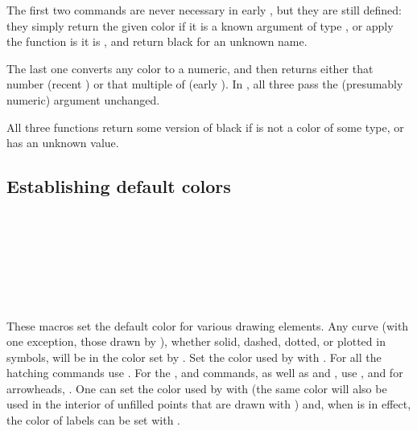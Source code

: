 \documentclass[letterpaper]{article}
\begin{document}
The first two commands are never necessary in early \MP{}, but they are
still defined: they simply return the given color if it is a known
argument of type , or apply the function  is it is
, and return black for an unknown name.

The last one  converts any color to a numeric, and then
returns either that number (recent \MP) or that multiple of 
(early \MP). In \MF{}, all three pass the (presumably numeric) argument
 unchanged.

All three functions return some version of black if  is not a
color of some type, or has an unknown value.


\subsection{Establishing \mfp{} default colors}\label{defaultcolors}

\begin{cd}
\\
\\
\\
\\
\\
\\
%
%
%
%
%
%
%
%
\end{cd}


These macros set the default color for various drawing elements. Any
curve (with one exception, those drawn by ), whether solid,
dashed, dotted, or plotted in symbols, will be in the color set by
. Set the color used by  with .
For all the hatching commands use . For the ,
and  commands, as well as  and
, use , and for arrowheads,
. One can set the color used by  with
 (the same color will also be used in the interior
of unfilled points that are drawn with ) and, when
 is in effect, the color of labels can be set with
.
\end{document}

